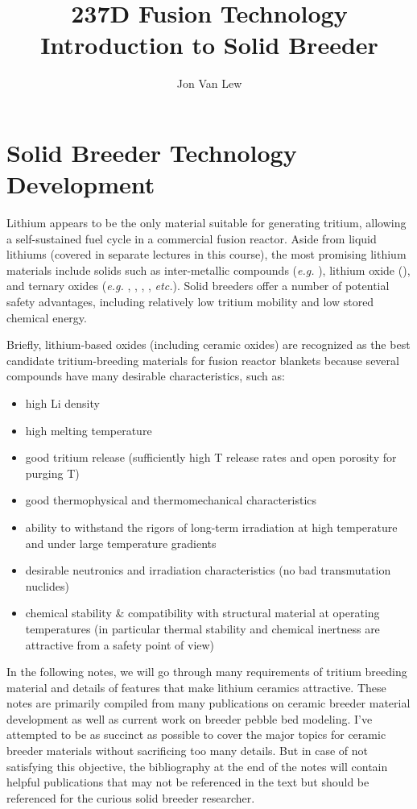 \documentclass[11pt]{report} %
\title{237D Fusion Technology \\
Introduction to Solid Breeder}
\author{Jon Van Lew}
\newcommand{\lit}{\ce{Li2TiO3}}
\newcommand{\lis}{\ce{Li4SiO4}}
\newcommand{\lio}{\ce{Li2O}}
\newcommand{\liz}{\ce{Li2ZrO3}}
\newcommand{\lial}{\ce{LiAlO2}}
\begin{document}
\maketitle
\chapter{Solid Breeder Technology Development}
Lithium appears to be the only material suitable for generating tritium, allowing a self-sustained fuel cycle in a commercial fusion reactor. Aside from liquid lithiums (covered in separate lectures in this course), the most promising lithium materials include solids such as inter-metallic compounds (\textit{e.g.} ), lithium oxide (\lio), and ternary oxides (\textit{e.g.} \lis, \lit, \lial, \liz, \textit{etc.}). Solid breeders offer a number of potential safety advantages, including relatively low tritium mobility and low stored chemical energy.

Briefly, lithium-based oxides (including ceramic oxides) are recognized as the best candidate tritium-breeding materials for fusion reactor blankets because several compounds have many desirable characteristics, such as: 
\begin{itemize}
\item{high Li density}
\item{high melting temperature}
\item good tritium release (sufficiently high T release rates and open porosity for purging T)
\item good thermophysical and thermomechanical characteristics
\item ability to withstand the rigors of long-term irradiation at high temperature and under large temperature gradients
\item{desirable neutronics and irradiation characteristics (no bad transmutation nuclides)}
\item{chemical stability \& compatibility with structural material at operating temperatures (in particular thermal stability and chemical inertness are attractive from a safety point of view)}
\end{itemize}

In the following notes, we will go through many requirements of tritium breeding material and details of features that make lithium ceramics attractive. These notes are primarily compiled from many publications on ceramic breeder material development as well as current work on breeder pebble bed modeling. I've attempted to be as succinct as possible to cover the major topics for ceramic breeder materials without sacrificing too many details. But in case of not satisfying this objective, the bibliography at the end of the notes will contain helpful publications that may not be referenced in the text but should be referenced for the curious solid breeder researcher.
\end{document}

